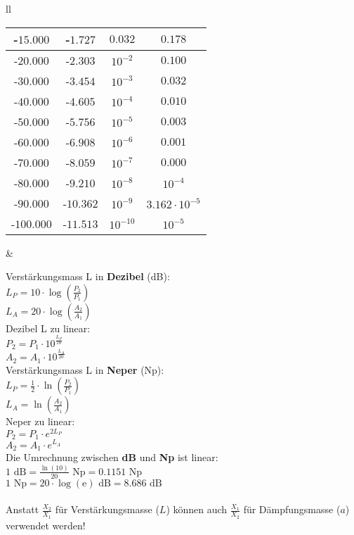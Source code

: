 \begin{tabular}{ll}
{\begin{tabular}{|c|c|c|c|}
    -$15.000$ & -$1.727$ & $0.032$ & $0.178$ \\ \hline
    -$20.000$ & -$2.303$ & $10^{-2}$ & $0.100$ \\ \hline
    -$30.000$ & -$3.454$ & $10^{-3}$ & $0.032$ \\ \hline
    -$40.000$ & -$4.605$ & $10^{-4}$ & $0.010$ \\ \hline
    -$50.000$ & -$5.756$ & $10^{-5}$ & $0.003$ \\ \hline
    -$60.000$ & -$6.908$ & $10^{-6}$ & $0.001$ \\ \hline
    -$70.000$ & -$8.059$ & $10^{-7}$ & $0.000$ \\ \hline
    -$80.000$ & -$9.210$ & $10^{-8}$ & $10^{-4}$ \\ \hline
    -$90.000$ & -$10.362$ & $10^{-9}$ & $3.162 \cdot 10^{-5}$ \\ \hline
    -$100.000$ & -$11.513$ & $10^{-10}$ & $10^{-5}$ \\ \hline
    \end{tabular}
    \renewcommand{\arraystretch}{1.0}

    \normalsize
}
& \parbox{11.5cm}{
Verstärkungsmass L in \textbf{Dezibel} (dB):\\
$L_P = 10 \cdot \log \left(\frac {P_2} {P_1}\right)$ \\
$L_A = 20 \cdot \log \left(\frac {A_2} {A_1}\right)$ \\ 

Dezibel L zu linear: \\
$P_2 = P_1 \cdot 10^{\frac{L_P}{10}} $ \\
$A_2 = A_1 \cdot 10^{\frac{L_A}{20}} $ \\

Verstärkungsmass L in \textbf{Neper} (Np):\\
$L_P = \frac {1}{2} \cdot \ln \left(\frac {P_2} {P_1}\right)$\\
$L_A = \ln \left(\frac {A_2} {A_1} \right)$ \\

Neper zu linear: \\
$P_2 = P_1 \cdot e^{2 L_P}$ \\
$A_2 = A_1 \cdot e^{L_A}$ \\

Die Umrechnung zwischen {\bf dB} und {\bf Np} ist linear: \\
$1\mbox{~dB} = \frac {\ln(10)} {20} \mbox{~Np} = 0.1151\mbox{~Np}$ \\
$1\mbox{~Np} = 20 \cdot \log(\mbox{e}) \mbox{~dB} = 8.686\mbox{~dB}$ \\ 
\\
Anstatt $\frac{X_2}{X_1}$ für Verstärkungsmasse ($L$) können auch
$\frac{X_1}{X_2}$ für Dämpfungsmasse ($a$) verwendet werden!

}
\end{tabular}
